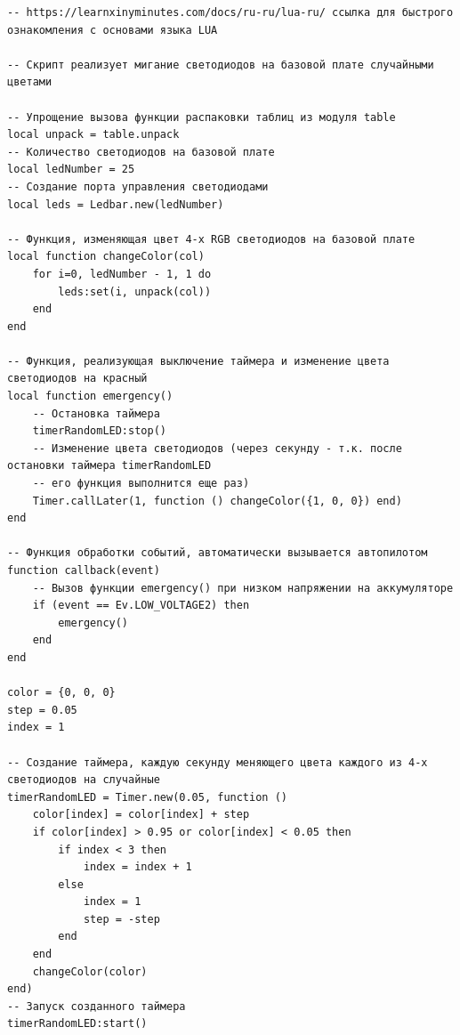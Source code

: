 \begin{verbatim}
-- https://learnxinyminutes.com/docs/ru-ru/lua-ru/ ссылка для быстрого ознакомления с основами языка LUA

-- Скрипт реализует мигание светодиодов на базовой плате случайными цветами

-- Упрощение вызова функции распаковки таблиц из модуля table
local unpack = table.unpack
-- Количество светодиодов на базовой плате
local ledNumber = 25
-- Создание порта управления светодиодами
local leds = Ledbar.new(ledNumber)

-- Функция, изменяющая цвет 4-х RGB светодиодов на базовой плате
local function changeColor(col)
    for i=0, ledNumber - 1, 1 do
        leds:set(i, unpack(col))
    end
end

-- Функция, реализующая выключение таймера и изменение цвета светодиодов на красный
local function emergency()
    -- Остановка таймера
    timerRandomLED:stop()
    -- Изменение цвета светодиодов (через секунду - т.к. после остановки таймера timerRandomLED
    -- его функция выполнится еще раз)
    Timer.callLater(1, function () changeColor({1, 0, 0}) end)
end

-- Функция обработки событий, автоматически вызывается автопилотом
function callback(event)
    -- Вызов функции emergency() при низком напряжении на аккумуляторе
    if (event == Ev.LOW_VOLTAGE2) then
        emergency()
    end
end

color = {0, 0, 0} 
step = 0.05 
index = 1

-- Создание таймера, каждую секунду меняющего цвета каждого из 4-х светодиодов на случайные
timerRandomLED = Timer.new(0.05, function ()
    color[index] = color[index] + step
    if color[index] > 0.95 or color[index] < 0.05 then
        if index < 3 then
            index = index + 1
        else
            index = 1
            step = -step
        end
    end
    changeColor(color)
end)
-- Запуск созданного таймера
timerRandomLED:start()
\end{verbatim}
